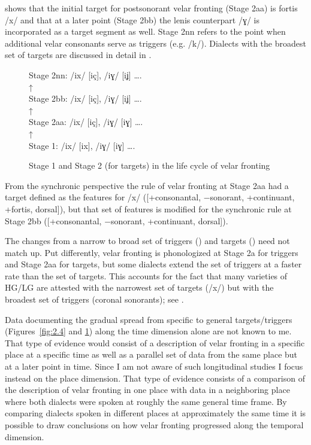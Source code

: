 \begin{xlist}
\begin{xlist}
 shows that the initial target for postsonorant velar fronting (Stage 2aa) is fortis /x/ and that at a later point (Stage 2bb) the lenis counterpart /ɣ/ is incorporated as a target segment as well. Stage 2nn refers to the point when additional velar consonants serve as triggers (e.g. /k/). Dialects with the broadest set of targets are discussed in detail in .

\begin{figure}
  Stage 2nn:    /ix/ [iç], /iɣ/ [iʝ] ….\\
       ↑\\
  Stage 2bb:    /ix/ [iç], /iɣ/ [iʝ] ….\\
       ↑\\
  Stage 2aa:    /ix/ [iç], /iɣ/ [iɣ] ….\\
                  ↑\\
  Stage 1:    /ix/ [ix], /iɣ/ [iɣ] ….
\caption{\label{fig:2.5}Stage 1 and Stage 2 (for targets) in the life cycle of velar fronting}
\end{figure}

From the synchronic perspective the rule of velar fronting at Stage 2aa had a target defined as the features for /x/ ([+consonantal, −sonorant, +continuant, +fortis, dorsal]), but that set of features is modified for the synchronic rule at Stage 2bb ([+consonantal, −sonorant, +continuant, dorsal]).

The changes from a narrow to broad set of triggers () and targets () need not match up. Put differently, velar fronting is phonologized at Stage 2a for triggers and Stage 2aa for targets, but some dialects extend the set of triggers at a faster rate than the set of targets. This accounts for the fact that many varieties of HG/LG are attested with the narrowest set of targets (/x/) but with the broadest set of triggers (coronal sonorants); see .

Data documenting the gradual spread from specific to general targets/triggers (Figures~\ref{fig:2.4} and \ref{fig:2.5}) along the time dimension alone are not known to me. That type of evidence would consist of a description of velar fronting in a specific place at a specific time as well as a parallel set of data from the same place but at a later point in time. Since I am not aware of such longitudinal studies I focus instead on the place dimension. That type of evidence consists of a comparison of the description of velar fronting in one place with data in a neighboring place where both dialects were spoken at roughly the same general time frame. By comparing dialects spoken in different places at approximately the same time it is possible to draw conclusions on how velar fronting progressed along the temporal dimension.


\end{xlist}
\end{xlist}
